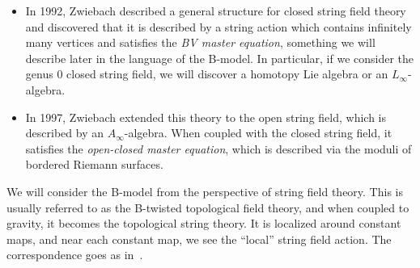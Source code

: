 \documentclass{amsart}
\theoremstyle{definition}
\theoremstyle{remark}
\theoremstyle{plain}
\theoremstyle{definition}
\theoremstyle{remark}
\newcommand{\1}{\mathbf{1}}
\newcommand{\2}{\mathbf{2}}
\newcommand{\3}{\mathbf{3}}
\begin{document}
\begin{itemize}
    \item In 1992, Zwiebach described a general structure for closed string field theory and discovered that it is described by a string action which contains infinitely many vertices and satisfies the \textit{BV master equation}, something we will describe later in the language of the B-model. In particular, if we consider the genus \(0\) closed string field, we will discover a homotopy Lie algebra or an \(L_{\infty}\)-algebra.
    \item In 1997, Zwiebach extended this theory to the open string field, which is described by an \(A_{\infty}\)-algebra. When coupled with the closed string field, it satisfies the \textit{open-closed master equation}, which is described via the moduli of bordered Riemann surfaces.
\end{itemize}



We will consider the B-model from the perspective of string field theory. This is usually referred to as the B-twisted topological field theory, and when coupled to gravity, it becomes the topological string theory. It is localized around constant maps, and near each constant map, we see the ``local'' string field action. The correspondence goes as in~.
\end{document}
